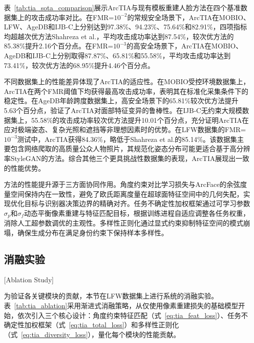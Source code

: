 表~\ref{tab:tia_sota_comparison}展示ArcTIA与现有模板重建人脸方法在四个基准数据集上的攻击成功率对比。在FMR=$10^{-2}$的常规安全场景下，ArcTIA在MOBIO、LFW、AgeDB和IJB-C上分别达到97.38\%、94.23\%、75.64\%和82.91\%，四项指标均超越次优方法Shahreza et al.，平均攻击成功率达到87.54\%，较次优方法的85.38\%提升2.16个百分点。在FMR=$10^{-3}$的高安全场景下，ArcTIA在MOBIO、AgeDB和IJB-C上分别取得87.87\%、65.81\%和55.58\%，平均攻击成功率达到73.41\%，较次优方法的68.95\%提升4.46个百分点。

不同数据集上的性能差异体现了ArcTIA的适应性。在MOBIO受控环境数据集上，ArcTIA在两个FMR阈值下均获得最高攻击成功率，表明其在标准化采集条件下的稳定性。在AgeDB年龄跨度数据集上，高安全场景下的65.81\%较次优方法提升5.63个百分点，验证了ArcTIA对面部特征变异的鲁棒性。在IJB-C无约束大规模数据集上，55.58\%的攻击成功率较次优方法提升10.01个百分点，充分证明ArcTIA在应对极端姿态、复杂光照和遮挡等非理想因素时的优势。在LFW数据集的FMR=$10^{-3}$测试中，ArcTIA获得84.36\%，略低于Shahreza et al.的85.14\%。该数据集主要包含网络爬取的高质量公众人物照片，其规范化姿态分布可能更适合基于高分辨率StyleGAN的方法。综合其他三个更具挑战性数据集的表现，ArcTIA展现出一致的性能优势。

方法的性能提升源于三方面协同作用。角度约束对比学习损失与ArcFace的余弦度量空间保持内在一致性，避免了欧氏距离度量在超球面特征空间中的几何失配，实现优化目标与识别器决策边界的精确对齐。任务不确定性加权框架通过可学习参数$\sigma_p$和$\sigma_f$动态平衡像素重建与特征匹配目标，根据训练进程自适应调整各任务权重，消除人工超参数调优的主观性。多样性正则化通过显式约束抑制特征空间的模式崩塌，确保生成分布在满足身份约束下保持样本多样性。

\subsection{消融实验}[Ablation Study]
\label{sec:tia_ablation}

为验证各关键模块的贡献，本节在LFW数据集上进行系统的消融实验。表~\ref{tab:tia_ablation}采用渐进式消融策略，从仅使用像素重建损失的基础模型开始，依次引入三个核心设计：角度约束特征匹配（式~\ref{eq:tia_feat_loss}）、任务不确定性加权框架（式~\ref{eq:tia_total_loss}）和多样性正则化（式~\ref{eq:tia_diversity_loss}），量化每个模块的性能贡献。

